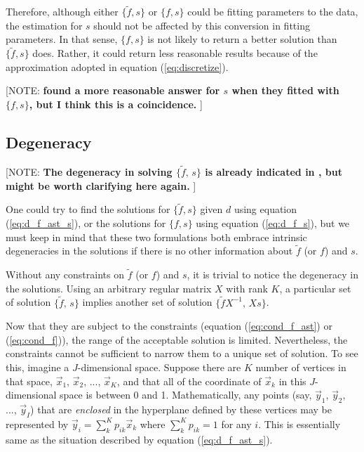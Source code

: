 \documentclass[iop,numberedappendix,apj,]{emulateapj}
\def\fast{\tilde f}
\def\memoYF#1{\color{red}[NOTE: {\bf #1}]\color{black}}
\begin{document}
Therefore, although either $\{ \fast, s \}$ or $\{ f, s \}$ could be fitting parameters to the data, the estimation for $s$ should not be affected by this conversion in fitting parameters. 
In that sense, $\{ f, s \}$ is not likely to return a better solution than $\{ \fast, s \}$ does. 
Rather, it could return less reasonable results because of the approximation adopted in equation (\ref{eq:discretize}). 

\memoYF{\citet{Cowan2013} found a more reasonable answer for $s$ when they fitted with $\{ f, s \}$, but I think this is a coincidence. }

\newpage

\subsection{Degeneracy}
\label{ss:degeneracy}

\memoYF{The degeneracy in solving $\{ \fast ,\,s\} $ is already indicated in \citet{Cowan2013}, but might be worth clarifying here again. }


One could try to find the solutions for $\{ \fast, s \}$ given $d$ using equation (\ref{eq:d_f_ast_s}), or the solutions for  $\{ f, s \}$ using equation (\ref{eq:d_f_s}), but we must keep in mind that 
these two formulations both embrace intrinsic degeneracies in the solutions if there is no other information about $\fast$ (or $f$) and $s$. 


Without any constraints on $\fast$ (or $f$) and $s$, it is trivial to notice the degeneracy in the solutions. 
Using an arbitrary regular matrix $X$ with rank $K$, a particular set of solution $\{ \fast ,\,s\}$ implies another set of solution $\{ \fast X^{-1},\,Xs\}$. 

Now that they are subject to the constraints (equation (\ref{eq:cond_f_ast}) or (\ref{eq:cond_f})), the range of the acceptable solution is limited. Nevertheless, the constraints cannot be sufficient to narrow them to a unique set of solution. 
%
To see this, %
imagine a $J$-dimensional space.
Suppose there are $K$ number of vertices in that space, $\vec x_1,\,\vec x_2,\,...,\,\vec x_K$, and that all of the coordinate of $\vec x_k$ in this $J$-dimensional space is between 0 and 1. 
Mathematically, any points (say, $\vec y_1$, $\vec y_2$, ..., $\vec y_I$) that are {\it enclosed} in the hyperplane defined by these vertices may be represented by $\vec y_i=\sum _k^K p_{ik} \vec x_k $ where $\sum _k^K p_{ik} = 1$ for any $i$. 
This is essentially same as the situation described by equation (\ref{eq:d_f_ast_s}). 
\end{document}
